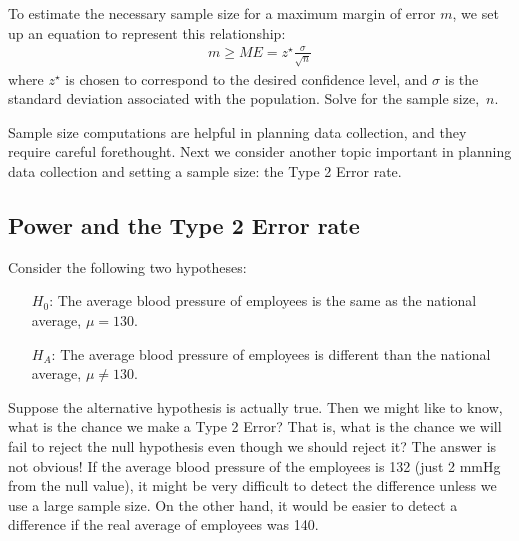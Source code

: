 \begin{termBox}{
To estimate the necessary sample size for a maximum margin of error $m$, we set up an equation to represent this relationship:
\begin{align*}
m \geq ME = z^{\star}\frac{\sigma}{\sqrt{n}}
\end{align*}
where $z^{\star}$ is chosen to correspond to the desired confidence level, and $\sigma$ is the standard deviation associated with the population. Solve for the sample size,~$n$.}
\end{termBox}

Sample size computations are helpful in planning data collection, and they require careful forethought. Next we consider another topic important in planning data collection and setting a sample size: the Type 2 Error rate.



\subsection{Power and the Type 2 Error rate}

Consider the following two hypotheses:
\begin{itemize}
\setlength{\itemsep}{0.5mm}
\item[$H_0$:] The average blood pressure of employees is the same as the national average, $\mu = 130$.
\item[$H_A$:] The average blood pressure of employees is different than the national average, $\mu \neq 130$.
\end{itemize}
Suppose the alternative hypothesis is actually true. Then we might like to know, what is the chance we make a Type 2 Error? That is, what is the chance we will fail to reject the null hypothesis even though we should reject it? The answer is not obvious! If the average blood pressure of the employees is 132 (just 2 mmHg from the null value), it might be very difficult to detect the difference unless we use a large sample size. On the other hand, it would be easier to detect a difference if the real average of employees was 140.

